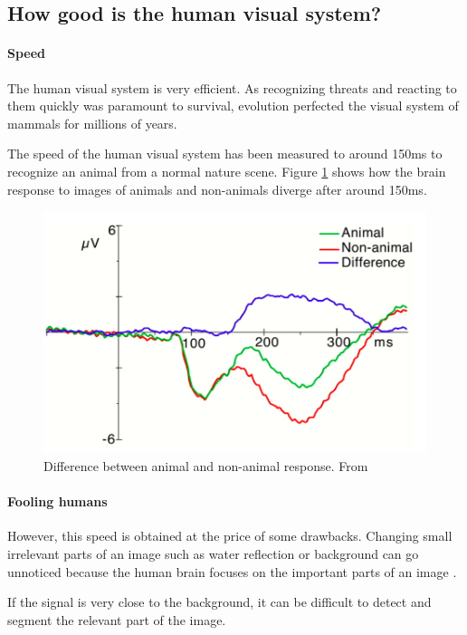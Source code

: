 \documentclass{article}
\begin{document}
\subsection{How good is the human visual system?}
\paragraph{Speed}
The human visual system is very efficient. As recognizing threats and reacting to them quickly was paramount to survival, evolution perfected the visual system of mammals for millions of years.

The speed of the human visual system has been measured \cite{speed} to around 150ms to recognize an animal from a normal nature scene. Figure \ref{fig:speed} shows how the brain response to images of animals and non-animals diverge after around 150ms.

\begin{figure}[h]
\begin{center}
\centerline{\includegraphics[width=0.8\columnwidth]{speed.png}}
\caption{Difference between animal and non-animal response. From \cite{speed}}
\label{fig:speed}
\end{center}
\end{figure} 


\paragraph{Fooling humans}
However, this speed is obtained at the price of some drawbacks. Changing small irrelevant parts of an image such as water reflection or background can go unnoticed because the human brain focuses on the important parts of an image \cite{failure}.

If the signal is very close to the background, it can be difficult to detect and segment the relevant part of the image.
\end{document}
